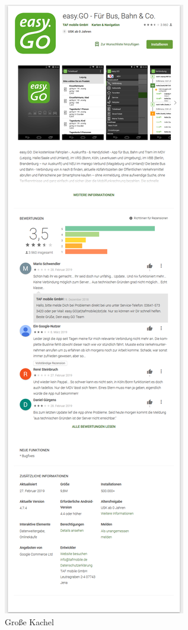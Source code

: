 \begin{itemize}
	\begin{figure}[H]
		\centering
		\includegraphics[scale=0.2]{pics/kachel3.png}
		\caption{Große Kachel}
		\label{kachel3}
	\end{figure}

\end{itemize}

